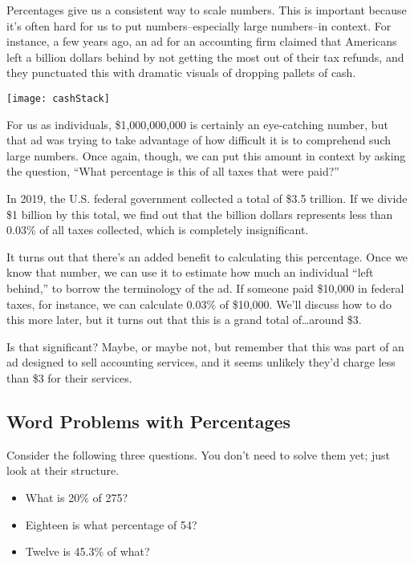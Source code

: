 Percentages give us a consistent way to scale numbers.  This is important because it's often hard for us to put numbers--especially large numbers--in context.  For instance, a few years ago, an ad for an accounting firm claimed that Americans left a billion dollars behind by not getting the most out of their tax refunds, and they punctuated this with dramatic visuals of dropping pallets of cash.

\begin{center}
\texttt{[image: cashStack]}
\end{center}

For us as individuals, \$1,000,000,000 is certainly an eye-catching number, but that ad was trying to take advantage of how difficult it is to comprehend such large numbers.  Once again, though, we can put this amount in context by asking the question, ``What percentage is this of all taxes that were paid?''

In 2019, the U.S. federal government collected a total of \$3.5 trillion.  If we divide \$1 billion by this total, we find out that the billion dollars represents less than 0.03\% of all taxes collected, which is completely insignificant.

It turns out that there's an added benefit to calculating this percentage.  Once we know that number, we can use it to estimate how much an individual ``left behind,'' to borrow the terminology of the ad.  If someone paid \$10,000 in federal taxes, for instance, we can calculate 0.03\% of \$10,000.  We'll discuss how to do this more later, but it turns out that this is a grand total of\ldots around \$3.

Is that significant?  Maybe, or maybe not, but remember that this was part of an ad designed to sell accounting services, and it seems unlikely they'd charge less than \$3 for their services.

\subsection{Word Problems with Percentages}
Consider the following three questions.  You don't need to solve them yet; just look at their structure.
\begin{itemize}
\item What is 20\% of 275?
\item Eighteen is what percentage of 54?
\item Twelve is 45.3\% of what?
\end{itemize}

